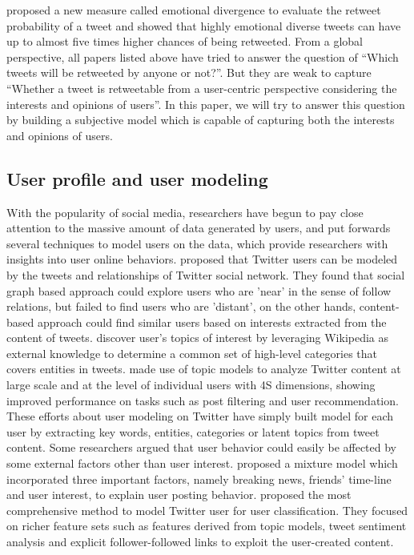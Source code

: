 \documentclass{acm_proc_article-sp}
\begin{document}
\cite{conf/icwsm/PfitznerGS12} proposed a new measure called emotional divergence to evaluate the retweet probability of a tweet and showed that highly emotional diverse tweets can have up to almost five times higher chances of being retweeted.
From a global perspective, all papers listed above have tried to answer the question of ``Which tweets will be retweeted by anyone or not?''. 
But they are weak to capture ``Whether a tweet is retweetable from a user-centric perspective considering the interests and opinions of users''. 
In this paper, we will try to answer this question by building a subjective model which is capable of capturing both the interests and opinions of users.
\subsection{User profile and user modeling}
With the popularity of social media, researchers have begun to pay close attention to the massive amount of data generated by users, and put forwards several techniques to model users on the data, which provide researchers with insights into user online behaviors. 
\cite{Hannon:2010} proposed that Twitter users can be modeled by the tweets and relationships of Twitter social network.
They found that social graph based approach could explore users who are ’near’ in the sense of follow relations, but failed to find users who are ’distant’, on the other hands, content-based approach could find similar users based on interests extracted from the content of tweets. 
\cite{conf/icwsm/MacskassyM11} discover user’s topics of interest by leveraging Wikipedia as external knowledge to determine a common set of high-level categories that covers entities in tweets. 
\cite{RamageEtAl:10} made use of topic models to analyze Twitter content at large scale and at the level of individual users with 4S dimensions, showing improved performance on tasks such as post filtering and user recommendation. 
These efforts about user modeling on Twitter have simply built model for each user by extracting key words, entities, categories or latent topics from tweet content. 
Some researchers argued that user behavior could easily be affected by some external factors other than user interest.
\cite{Xu:2012MUP} proposed a mixture model which incorporated three important factors, namely breaking news, friends’ time-line and user interest, to explain user posting behavior.
\cite{Pennacchiotti:icwsm11} proposed the most comprehensive method to model Twitter user for user classification. They focused on richer feature sets such as features derived from topic models, tweet sentiment analysis and explicit follower-followed links to exploit the user-created content. 
\end{document}
